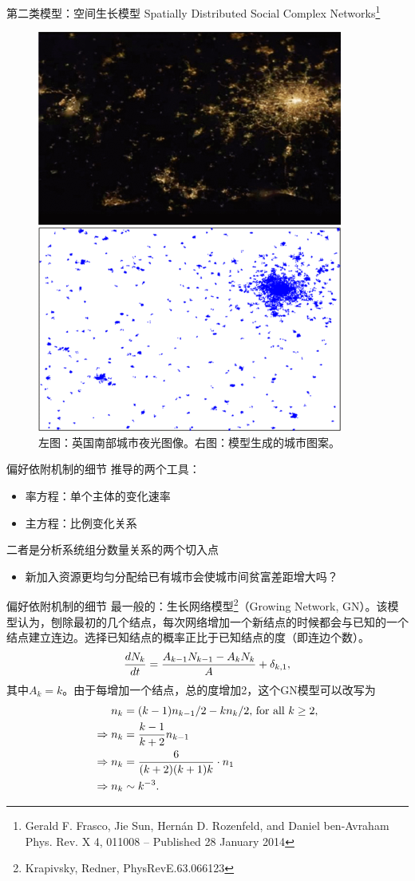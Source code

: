 \documentclass[utf8]{ctexbeamer}
\begin{document}
\begin{frame}{第二类模型：空间生长模型}
    Spatially Distributed Social Complex Networks\footnote{Gerald F. Frasco, Jie Sun, Hernán D. Rozenfeld, and Daniel ben-Avraham
    Phys. Rev. X 4, 011008 – Published 28 January 2014}
    \begin{figure}
        \centering
        \includegraphics[width = 0.3\linewidth]{图片/medium.png}
        \caption{左图：英国南部城市夜光图像。右图：模型生成的城市图案。}
    \end{figure}
\end{frame}

        

\begin{frame}{偏好依附机制的细节}
    推导的两个工具：
    \begin{itemize}
        \item 率方程：单个主体的变化速率
        \item 主方程：比例变化关系
    \end{itemize}
    二者是分析系统组分数量关系的两个切入点
    \begin{itemize}
        \item 新加入资源更均匀分配给已有城市会使城市间贫富差距增大吗？
    \end{itemize}

\end{frame}

\begin{frame}{偏好依附机制的细节}
    最一般的：生长网络模型\footnote{Krapivsky, Redner, PhysRevE.63.066123}（Growing Network, GN）。该模型认为，刨除最初的几个结点，每次网络增加一个新结点的时候都会与已知的一个结点建立连边。选择已知结点的概率正比于已知结点的度（即连边个数）。
\begin{align} 
    \frac{dN_k}{dt} = \frac{A_{k-1}N_{k-1} - A_k N_k}{A} + \delta_{k,1},\notag
\end{align}其中$A_k=k$。由于每增加一个结点，总的度增加2，这个GN模型可以改写为\begin{align}n_k &= (k-1)n_{k-1}/2 - kn_{k}/2 \text{, for all }k \geq 2, \notag\\
    \Rightarrow n_k &= \frac{k-1}{k+2}n_{k-1}\notag\\ 
    \Rightarrow n_k &= \frac{6}{(k+2)(k+1)k}\cdot n_1\notag\\ 
    \Rightarrow n_k &\sim k^{-3}.
\end{align}
\end{frame}
\end{document}
